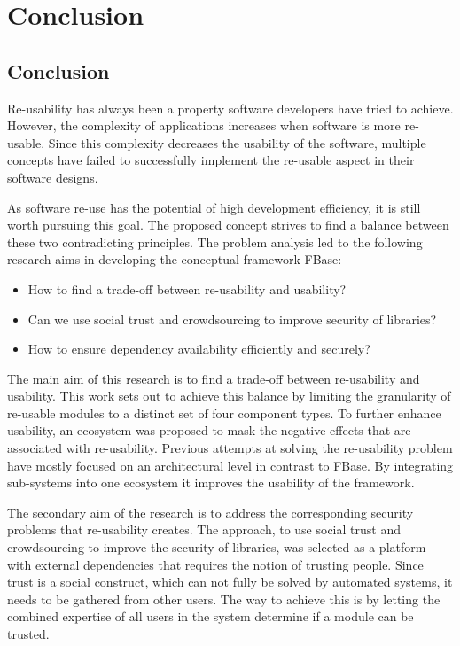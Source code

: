 \chapter{\label{chap:conclusion}Conclusion}

\section{Conclusion}
Re-usability has always been a property software developers have tried to achieve. However, the complexity of applications increases when software is more re-usable. Since this complexity decreases the usability of the software, multiple concepts have failed to successfully implement the re-usable aspect in their software designs.

As software re-use has the potential of high development efficiency, it is still worth pursuing this goal.  The proposed concept strives to find a balance between these two contradicting principles. 
The problem analysis led to the following research aims in developing the conceptual framework FBase:

\begin{itemize}
	\item How to find a trade-off between re-usability and usability?
	\item Can we use social trust and crowdsourcing to improve security of libraries?
	\item How to ensure dependency availability efficiently and securely?
\end{itemize}

\noindent The main aim of this research is to find a trade-off between re-usability and usability. This work sets out to achieve this balance by limiting the granularity of re-usable modules to a distinct set of four component types. To further enhance usability, an ecosystem was proposed to mask the negative effects that are associated with re-usability. Previous attempts at solving the re-usability problem have mostly focused on an architectural level in contrast to FBase. By integrating sub-systems into one ecosystem it improves the usability of the framework. 

The secondary aim of the research is to address the corresponding security problems that re-usability creates. The approach, to use social trust and crowdsourcing to improve the security of libraries, was selected as a platform with external dependencies that requires the notion of trusting people. Since trust is a social construct, which can not fully be solved by automated systems, it needs to be gathered from other users. The way to achieve this is by letting the combined expertise of all users in the system determine if a module can be trusted.


